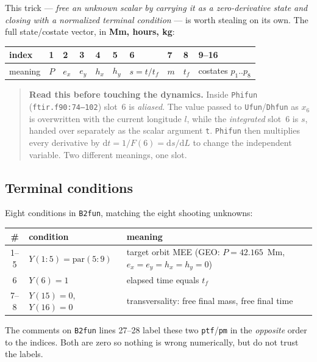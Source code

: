 \documentclass[11pt]{article}
\newcommand{\code}[1]{\texttt{\small #1}}
\newcommand{\file}[1]{\texttt{\small #1}}
\begin{document}
\noindent
This trick --- \emph{free an unknown scalar by carrying it as a
zero-derivative state and closing with a normalized terminal condition} --- is
worth stealing on its own. The full state/costate vector, in
\textbf{Mm, hours, kg}:

\begin{center}
\begin{tabular}{@{}llllllllll@{}}
\toprule
index & 1 & 2 & 3 & 4 & 5 & 6 & 7 & 8 & 9--16\\
\midrule
meaning & $P$ & $e_x$ & $e_y$ & $h_x$ & $h_y$ & $s=t/t_f$ & $m$ & $t_f$ &
costates $p_1..p_8$\\
\bottomrule
\end{tabular}
\end{center}

\begin{quote}\small
\textbf{Read this before touching the dynamics.} Inside \code{Phifun}
(\file{ftir.f90:74--102}) slot~6 is \emph{aliased}. The value passed to
\code{Ufun}/\code{Dhfun} as $x_6$ is overwritten with the current longitude
$l$, while the \emph{integrated} slot~6 is $s$, handed over separately as the
scalar argument \code{t}. \code{Phifun} then multiplies every derivative by
$\mathrm{d}t = 1/F(6) = \mathrm{d}s/\mathrm{d}L$ to change the independent
variable. Two different meanings, one slot.
\end{quote}

\subsection{Terminal conditions}

Eight conditions in \code{B2fun}, matching the eight shooting unknowns:

\begin{center}
\begin{tabular}{@{}cll@{}}
\toprule
\# & condition & meaning\\
\midrule
1--5 & $Y(1{:}5) = \mathrm{par}(5{:}9)$ & target orbit MEE (GEO:
$P = 42.165$~Mm, $e_x=e_y=h_x=h_y=0$)\\
6 & $Y(6) = 1$ & elapsed time equals $t_f$\\
7--8 & $Y(15) = 0$, $Y(16) = 0$ & transversality: free final mass, free final
time\\
\bottomrule
\end{tabular}
\end{center}

\noindent
The comments on \code{B2fun} lines 27--28 label these two \code{ptf}/\code{pm}
in the \emph{opposite} order to the indices. Both are zero so nothing is wrong
numerically, but do not trust the labels.
\end{document}
